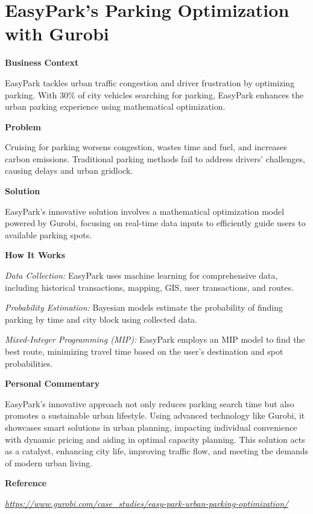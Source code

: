 \documentclass[
  letterpaper,
  DIV=11,
  numbers=noendperiod]{scrreprt}
\begin{document}

\hypertarget{easyparks-parking-optimization-with-gurobi}{%
\chapter{EasyPark's Parking Optimization with
Gurobi}\label{easyparks-parking-optimization-with-gurobi}}

\textbf{Business Context}

EasyPark tackles urban traffic congestion and driver frustration by
optimizing parking. With 30\% of city vehicles searching for parking,
EasyPark enhances the urban parking experience using mathematical
optimization.

\textbf{Problem}

Cruising for parking worsens congestion, wastes time and fuel, and
increases carbon emissions. Traditional parking methods fail to address
drivers' challenges, causing delays and urban gridlock.

\textbf{Solution}

EasyPark's innovative solution involves a mathematical optimization
model powered by Gurobi, focusing on real-time data inputs to
efficiently guide users to available parking spots.

\textbf{How It Works}

\emph{Data Collection:} EasyPark uses machine learning for comprehensive
data, including historical transactions, mapping, GIS, user
transactions, and routes.

\emph{Probability Estimation:} Bayesian models estimate the probability
of finding parking by time and city block using collected data.

\emph{Mixed-Integer Programming (MIP):} EasyPark employs an MIP model to
find the best route, minimizing travel time based on the user's
destination and spot probabilities.

\textbf{Personal Commentary}

EasyPark's innovative approach not only reduces parking search time but
also promotes a sustainable urban lifestyle. Using advanced technology
like Gurobi, it showcases smart solutions in urban planning, impacting
individual convenience with dynamic pricing and aiding in optimal
capacity planning. This solution acts as a catalyst, enhancing city
life, improving traffic flow, and meeting the demands of modern urban
living.

\textbf{Reference}

\href{https://www.gurobi.com/case_studies/easy-park-urban-parking-optimization/}{\emph{https://www.gurobi.com/case\_studies/easy-park-urban-parking-optimization/}}
\end{document}

